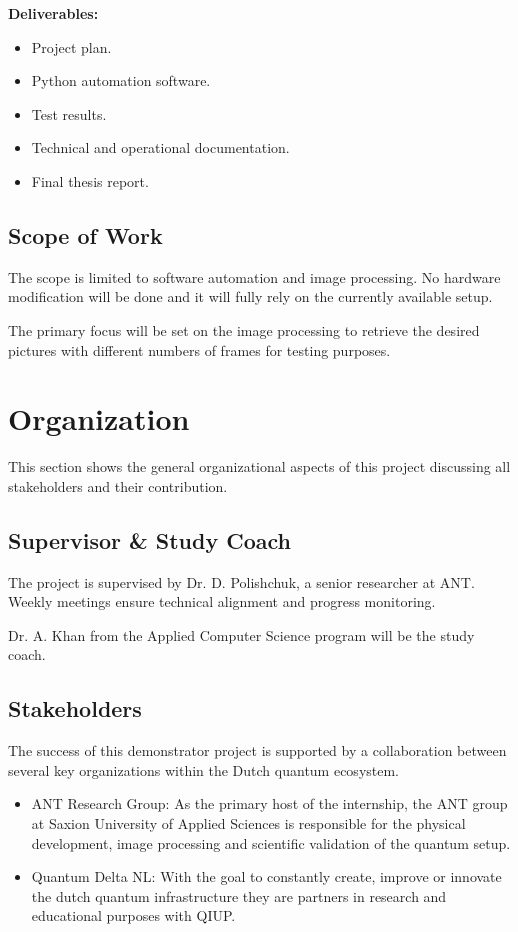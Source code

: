 \documentclass[12pt,a4paper]{article}
\begin{document}
\textbf{Deliverables:}
\begin{itemize}
    \item Project plan.
    \item Python automation software.
    \item Test results.
    \item Technical and operational documentation.
    \item Final thesis report.
\end{itemize}

\subsection{Scope of Work}
The scope is limited to software automation and image processing.
No hardware modification will be done and it will fully rely on the currently available setup.

The primary focus will be set on the image processing to retrieve the desired pictures with different numbers of frames for testing purposes.
\newpage


\section{Organization}

This section shows the general organizational aspects of this project discussing all stakeholders and their contribution.

\subsection*{Supervisor \& Study Coach}
The project is supervised by Dr. D. Polishchuk, a senior researcher at \ac{ANT}. Weekly meetings ensure technical alignment and progress monitoring. 

Dr. A. Khan from the Applied Computer Science program will be the study coach.

\subsection*{Stakeholders}
The success of this demonstrator project is supported by a collaboration between several key organizations within the Dutch quantum ecosystem.

\begin{itemize}
    \item \ac{ANT} Research Group: As the primary host of the internship, the \ac{ANT} group at Saxion University of Applied Sciences is responsible for the physical development, image processing and scientific validation of the quantum setup.
    \item Quantum Delta NL: With the goal to constantly create, improve or innovate the dutch quantum infrastructure they are partners in research and educational purposes with \ac{QIUP}.
\end{itemize}
\end{document}
